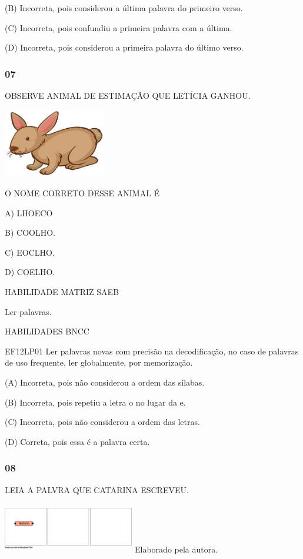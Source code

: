 (B) Incorreta, pois considerou a última palavra do primeiro verso.

(C) Incorreta, pois confundiu a primeira palavra com a última.

(D) Incorreta, pois considerou a primeira palavra do último
verso.\protect\hypertarget{_heading=h.bww9mmn8u5sl}{}{}

\subsubsection{07}\label{section-79}

OBSERVE ANIMAL DE ESTIMAÇÃO QUE LETÍCIA GANHOU.

\includegraphics[width=1.75903in,height=1.18611in]{media/image246.jpg}

O NOME CORRETO DESSE ANIMAL É

A) LHOECO

B) COOLHO.

C) EOCLHO.

D) COELHO.

HABILIDADE MATRIZ SAEB

Ler palavras.

HABILIDADES BNCC

EF12LP01 Ler palavras novas com precisão na decodificação, no caso de
palavras de uso frequente, ler globalmente, por memorização.

(A) Incorreta, pois não considerou a ordem das sílabas.

(B) Incorreta, pois repetiu a letra o no lugar da e.

(C) Incorreta, pois não considerou a ordem das letras.

(D) Correta, pois essa é a palavra
certa.\protect\hypertarget{_heading=h.9bc4fu3nu5it}{}{}

\subsubsection{08}\label{section-80}

LEIA A PALVRA QUE CATARINA ESCREVEU.

\includegraphics[width=2.25361in,height=0.86599in]{media/image247.png}
Elaborado pela autora.

